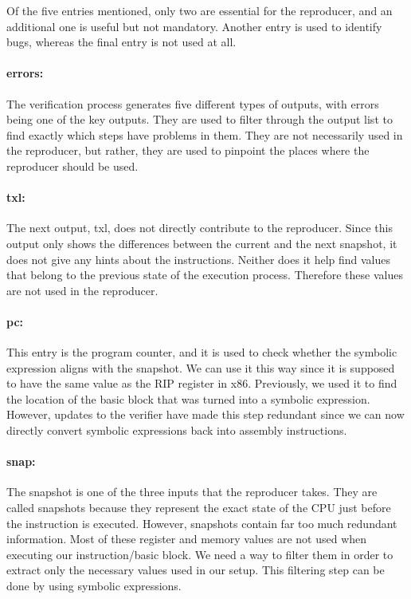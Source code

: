 Of the five entries mentioned, only two are essential for the reproducer, and an additional one is useful but not mandatory.
Another entry is used to identify bugs, whereas the final entry is not used at all.

\paragraph{errors:}
The verification process generates five different types of outputs, with errors being one of the key outputs.
They are used to filter through the output list to find exactly which steps have problems in them.
They are not necessarily used in the reproducer, but rather, they are used to pinpoint the places where the reproducer should be used.

\paragraph{txl:}
The next output, txl, does not directly contribute to the reproducer.
Since this output only shows the differences between the current and the next snapshot, it does not give any hints about the instructions.
Neither does it help find values that belong to the previous state of the execution process.
Therefore these values are not used in the reproducer.

\paragraph{pc:}
This entry is the program counter, and it is used to check whether the symbolic expression aligns with the snapshot.
We can use it this way since it is supposed to have the same value as the RIP register in x86.
Previously, we used it to find the location of the basic block that was turned into a symbolic expression.
However, updates to the verifier have made this step redundant since we can now directly convert symbolic expressions back into assembly instructions.

\paragraph{snap:}
The snapshot is one of the three inputs that the reproducer takes.
They are called snapshots because they represent the exact state of the CPU just before the instruction is executed.
However, snapshots contain far too much redundant information.
Most of these register and memory values are not used when executing our instruction/basic block.
We need a way to filter them in order to extract only the necessary values used in our setup.
This filtering step can be done by using symbolic expressions. 

